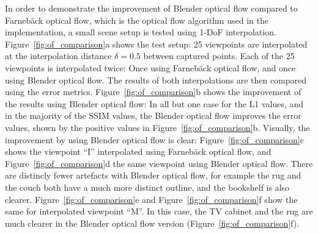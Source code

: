 In order to demonstrate the improvement of Blender optical flow compared to Farneb\"ack optical flow, which is the optical flow algorithm used in the implementation, a small scene setup is tested using 1-DoF interpolation. Figure~\ref{fig:of_comparison}a shows the test setup: 25 viewpoints are interpolated at the interpolation distance $\delta = 0.5$ between captured points. Each of the 25 viewpoints is interpolated twice: Once using Farneb\"ack optical flow, and once using Blender optical flow. The results of both interpolations are then compared using the error metrics.
Figure~\ref{fig:of_comparison}b shows the improvement of the results using Blender optical flow: In all but one case for the L1 values, and in the majority of the SSIM values, the Blender optical flow improves the error values, shown by the positive values in Figure~\ref{fig:of_comparison}b. Visually, the improvement by using Blender optical flow is clear: Figure~\ref{fig:of_comparison}c shows the viewpoint ``I'' interpolated using Farneb\"ack optical flow, and Figure~\ref{fig:of_comparison}d the same viewpoint using Blender optical flow. There are distincly fewer artefacts with Blender optical flow, for example the rug and the couch both have a much more distinct outline, and the bookshelf is also clearer. Figure~\ref{fig:of_comparison}e and Figure~\ref{fig:of_comparison}f show the same for interpolated viewpoint ``M''. In this case, the TV cabinet and the rug are much clearer in the Blender optical flow version (Figure~\ref{fig:of_comparison}f).

